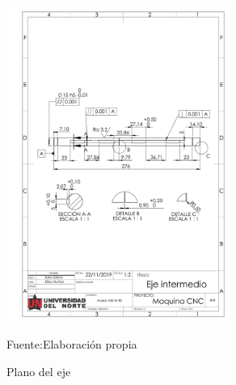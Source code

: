 \begin{figure}[ht]
    \centering
    \includegraphics[width =0.65\textwidth]{Cap5_DisenoDetallado/Figuras/eje2.PDF}
    \caption{Plano del eje}{Fuente:Elaboración propia}
    \label{fig:Planos_eje}
\end{figure}

